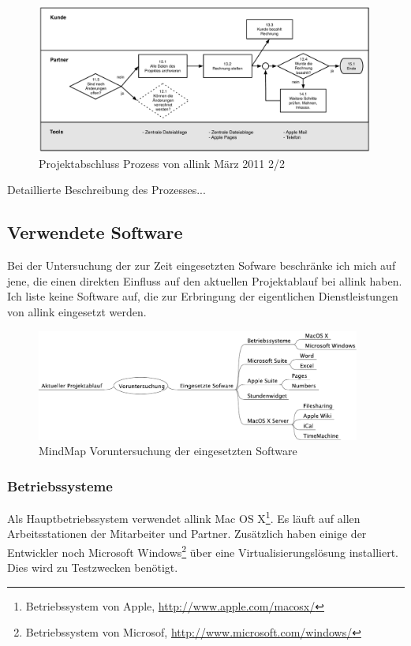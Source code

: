 \begin{figure}[htbp]
\begin{center}
\includegraphics[width=0.99\textwidth,angle=0]{./bilder/analyse/03_ist_prozesse_abschluss_02.pdf}
\caption{Projektabschluss Prozess von allink März 2011 2/2}
\label{pic:03_ist_prozesse_abschluss_02}
\end{center}
\end{figure}

Detaillierte Beschreibung des Prozesses...

\subsection{Verwendete Software}
Bei der Untersuchung der zur Zeit eingesetzten Sofware beschränke ich mich auf jene,
die einen direkten Einfluss auf den aktuellen Projektablauf bei allink haben.
Ich liste keine Software auf, die zur Erbringung der eigentlichen Dienstleistungen
von allink eingesetzt werden.

\begin{figure}[htbp]
\begin{center}
\includegraphics[width=0.95\textwidth,angle=0]{./bilder/analyse/mindmaps/voruntersuchung_software.pdf}
\caption{MindMap Voruntersuchung der eingesetzten Software}
\label{pic:voruntersuchung_software}
\end{center}
\end{figure}

\subsubsection{Betriebssysteme}
Als Hauptbetriebssystem verwendet allink Mac OS X\footnote{Betriebssystem von Apple, \url{http://www.apple.com/macosx/}}.
Es läuft auf allen Arbeitsstationen der Mitarbeiter und Partner. Zusätzlich haben einige der
Entwickler noch Microsoft Windows\footnote{Betriebssystem von Microsof, \url{http://www.microsoft.com/windows/}}
über eine Virtualisierungslösung installiert. Dies wird zu Testzwecken benötigt.

